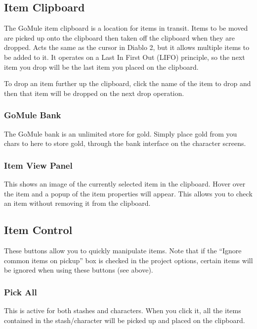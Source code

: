 \documentclass[a4paper,10pt]{article}
\begin{document}
\subsection{Item Clipboard}

The GoMule item clipboard is a location for items in transit. Items to be moved are picked up onto the clipboard then taken off the clipboard when they are dropped. Acts the same as the cursor in Diablo 2, but it allows multiple items to be added to it. It operates on a Last In First Out (LIFO) principle, so the next item you drop will be the last item you placed on the clipboard.

To drop an item further up the clipboard, click the name of the item to drop and then that item will be dropped on the next drop operation.

\subsubsection{GoMule Bank}

The GoMule bank is an unlimited store for gold. Simply place gold from you chars to here to store gold, through the bank interface on the character screens.

\subsubsection{Item View Panel}

This shows an image of the currently selected item in the clipboard. Hover over the item and a popup of the item properties will appear. This allows you to check an item without removing it from the clipboard.

\subsection{Item Control}

These buttons allow you to quickly manipulate items. Note that if the ``Ignore common items on pickup'' box is checked in the project options, certain items will be ignored when using these buttons (see above).

\subsubsection{Pick All}

This is active for both stashes and characters. When you click it, all the items contained in the stash/character will be picked up and placed on the clipboard.
\end{document}
